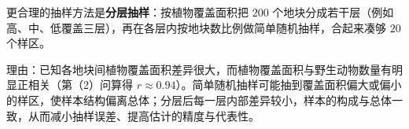\begin{answer}

更合理的抽样方法是\textbf{分层抽样}：按植物覆盖面积把 $200$ 个地块分成若干层（例如高、中、低覆盖三层），再在各层内按地块数比例做简单随机抽样，合起来凑够 $20$ 个样区。

理由：已知各地块间植物覆盖面积差异很大，而植物覆盖面积与野生动物数量有明显正相关（第（2）问算得 $r\approx0.94$）。简单随机抽样可能抽到覆盖面积偏大或偏小的样区，使样本结构偏离总体；分层后每一层内部差异较小，样本的构成与总体一致，从而减小抽样误差、提高估计的精度与代表性。




\end{answer}
